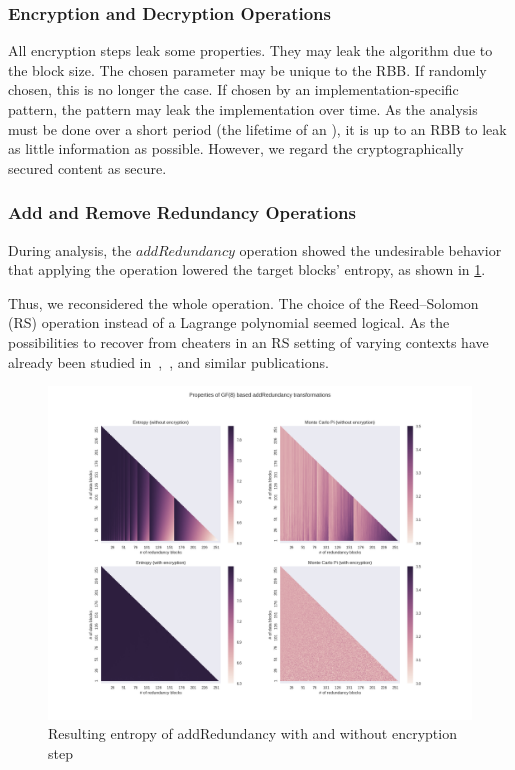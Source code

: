 \subsubsection{Encryption and Decryption Operations}
All encryption steps leak some properties. They may leak the algorithm due to the block size. The chosen parameter may be unique to the RBB. If randomly chosen, this is no longer the case. If chosen by an implementation-specific pattern, the pattern may leak the implementation over time. As the analysis must be done over a short period (the lifetime of an ), it is up to an RBB to leak as little information as possible. However, we regard the cryptographically secured content as secure. 

\subsubsection{Add and Remove Redundancy Operations}\label{sec:analysisReedSolomon}
During analysis, the $addRedundancy$ operation showed the undesirable behavior that applying the operation lowered the target blocks' entropy, as shown in \cref{fig:entropy}. 

Thus, we reconsidered the whole operation. The choice of the Reed--Solomon (RS) operation instead of a Lagrange polynomial seemed logical. As the possibilities to recover from cheaters in an RS setting of varying contexts have already been studied in~\cite{mceliece1981sharing},~\cite{bu2017rasss}, and similar publications.

\begin{figure}[!t]\centering
	\includegraphics[width=1\textwidth]{inc/randomblock_10kb}
	\caption{Resulting entropy of addRedundancy with and without encryption step}
	\label{fig:entropy}
\end{figure}


